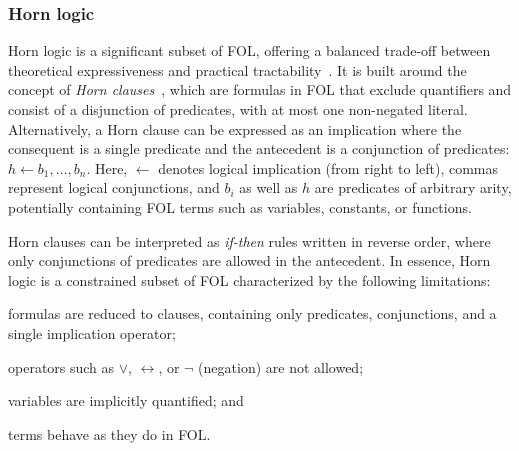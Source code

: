 \subsubsection{Horn logic}\label{subsubsec:horn-logic}
%
Horn logic is a significant subset of \gls{FOL}, offering a balanced trade-off between theoretical expressiveness and practical tractability~\cite{DBLP:journals/jcss/Makowsky87}.
%
It is built around the concept of \emph{Horn clauses}~\cite{DBLP:journals/jsyml/Horn51}, which are formulas in \gls{FOL} that exclude quantifiers and consist of a disjunction of predicates, with at most one non-negated literal.
%
Alternatively, a Horn clause can be expressed as an implication where the consequent is a single predicate and the antecedent is a conjunction of predicates: \(h \gets b_1, \dots, b_n\).
%
Here, \(\gets\) denotes logical implication (from right to left), commas represent logical conjunctions, and \(b_i\) as well as \(h\) are predicates of arbitrary arity, potentially containing \gls{FOL} terms such as variables, constants, or functions.

Horn clauses can be interpreted as \emph{if-then} rules written in reverse order, where only conjunctions of predicates are allowed in the antecedent.
%
In essence, Horn logic is a constrained subset of \gls{FOL} characterized by the following limitations:
%
\begin{inlinelist}
%
    \item formulas are reduced to clauses, containing only predicates, conjunctions, and a single implication operator;
    \item operators such as \(\lor\), \(\leftrightarrow\), or \(\neg\) (negation) are not allowed;
    \item variables are implicitly quantified; and
    \item terms behave as they do in \gls{FOL}.
\end{inlinelist}


